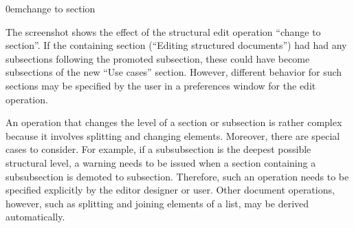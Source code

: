 \documentclass{speauth}
\begin{document}
{0em}{\small change to section}
 
The screenshot shows the effect of the structural edit operation ``change to section''. If the containing section (``Editing structured documents'') had had any subsections following the promoted subsection, these could have become subsections of the new ``Use cases'' section. However, different behavior for such sections may be specified by the user in a preferences window for the edit operation.

An operation that changes the level of a section or subsection is rather complex because it involves splitting and changing elements. Moreover, there are special cases to consider. For example, if a subsubsection is the deepest possible structural level, a warning needs to be issued when a section containing a subsubsection is demoted to subsection. Therefore, such an operation needs to be specified explicitly by the editor designer or user. Other document operations, however, such as splitting and joining elements of a list, may be derived automatically.
\end{document}

